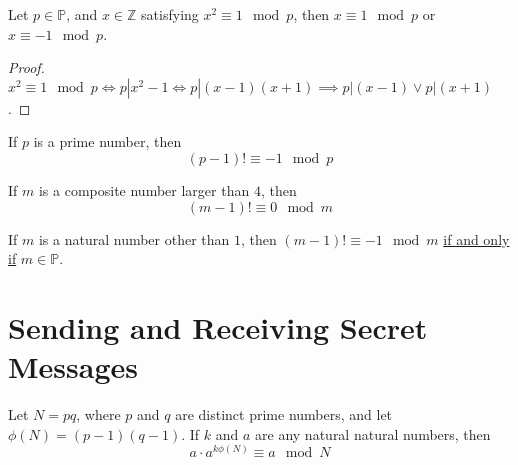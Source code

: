 \documentclass[11pt]{article}
\begin{document}
		\begin{theorem}[5.1.7]
			Let $p \in \mathbb{P}$, and $x \in \mathbb{Z}$ satisfying $x^2 \equiv 1 \mod p$, then $x \equiv 1 \mod p$ or $x \equiv -1 \mod p$.
		\end{theorem}
		\begin{proof}
			$x^2 \equiv 1 \mod p \iff p|x^2-1 \iff p|(x-1)(x+1) \implies p|(x-1) \lor p | (x+1)$.
		\end{proof}
		
		\begin{theorem}
			If $p$ is a prime number, then
			\[
				(p-1)! \equiv -1 \mod p
			\]
		\end{theorem}
		
		\begin{theorem}[5.2.2]
			If $m$ is a composite number larger than $4$, then
			\[
				(m-1)! \equiv 0 \mod m
			\]
		\end{theorem}
		
		\begin{theorem}
			If $m$ is a natural number other than $1$, then $(m-1)! \equiv -1 \mod m$ \ul{if and only if} $m \in \mathbb{P}$.
		\end{theorem}
	
	\section{Sending and Receiving Secret Messages}
		\begin{theorem}[6.1.2]
			Let $N=pq$, where $p$ and $q$ are distinct prime numbers, and let $\phi(N) = (p-1)(q-1)$. If $k$ and $a$ are any natural natural numbers, then 
			\[
				a \cdot a^{k \phi(N)} \equiv a \mod N
			\]
		\end{theorem}
		
\end{document}
